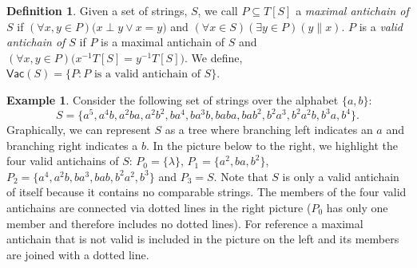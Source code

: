 \documentclass[12pt]{amsart}
\theoremstyle{definition}
\newtheorem{definition}{Definition}
\newtheorem{example}{Example}
\newcommand{\vac} {\mathsf{Vac}}
\begin{document}
\begin{definition}\label{anti-def}
Given a set of strings, $S$, we call $P \subseteq T[S]$ a \emph{maximal antichain of $S$} if $(\forall x,y\in P)\big(x\perp y \vee x = y\big)$ and $(\forall x\in S)(\exists y\in P)(y \parallel x)$.  $P$ is a \emph{valid antichain of $S$} if $P$ is a maximal antichain of $S$ and $(\forall x,y \in  P)\big(x^{-1}T[S] = y^{-1}T[S]\big)$.  We define, $\vac(S) = \{P:P \mbox{ is a valid antichain of $S$}\}$.
\end{definition}


\begin{example}
Consider the following set of strings over the alphabet $\{a,b\}$:
$$S = \{ a^5,a^4b,a^2ba,a^2b^2,ba^4,ba^3b,baba,bab^2,b^2a^3,b^2a^2b,b^3a,b^4 \}.$$
%
Graphically, we can represent $S$ as a tree where branching left indicates an $a$ and branching right indicates a $b$.  In the picture below to the right, we highlight the four valid antichains of $S$: $P_0 = \{ \lambda \}$, $P_1 = \{ a^2,ba,b^2 \}$, $P_2 = \{ a^4,a^2b,ba^3,bab,b^2a^2,b^3 \}$ and $P_3 = S$.  Note that $S$ is only a valid antichain of itself because it contains no comparable strings.  The members of the four valid antichains are connected via dotted lines in the right picture ($P_0$ has only one member and therefore includes no dotted lines).  For reference a maximal antichain that is not valid is included in the picture on the left and its members are joined with a dotted line.
%
%
%
%
\begin{figure}[H]
\centering
{}
\end{figure}
\end{example}
\end{document}
